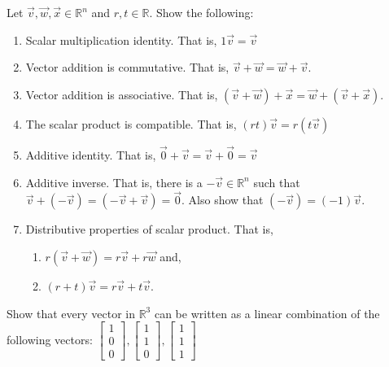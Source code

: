 \begin{exercise}
Let $\vec{v},\vec{w},\vec{x} \in \mathbb{R}^n$ and $r,t \in \mathbb{R}$. Show 
the following:
\begin{enumerate}[label=\alph*.)]
 \item Scalar multiplication identity. That is, $1 \vec{v}=\vec{v}$
\item Vector addition is commutative. That is, 
$\vec{v}+\vec{w}=\vec{w}+\vec{v}$.
\item Vector addition is associative. That is, 
$(\vec{v}+\vec{w})+\vec{x}=\vec{w}+(\vec{v}+\vec{x})$.
\item The scalar product is compatible. That is, $(rt) \vec{v}=r(t \vec{v})$
\item Additive identity. That is, $\vec{0}+\vec{v}=\vec{v}+\vec{0}=\vec{v}$
\item Additive inverse. That is, there is a $-\vec{v} \in \mathbb{R}^n$ such 
that $\vec{v}+(-\vec{v})=(-\vec{v}+\vec{v})=\vec{0}$. 
Also show that $(-\vec{v})=(-1)\vec{v}$. 
\item Distributive properties of scalar product. That is, 
\begin{enumerate}[label=\roman*.)]
 \item  $r(\vec{v}+\vec{w})=r\vec{v}+r\vec{w}$ and,
\item  $(r+t)\vec{v}=r\vec{v}+t\vec{v}$.
\end{enumerate}
\end{enumerate} 
\end{exercise}


\begin{exercise}
Show that every vector in $\mathbb{R}^3$ can be written as a linear combination 
of the following vectors: $\begin{bmatrix}1\\ 0 \\ 0\end{bmatrix}, 
\begin{bmatrix}1\\ 1 \\ 0\end{bmatrix},\begin{bmatrix}1\\ 1 \\ 1\end{bmatrix}$
\end{exercise}


